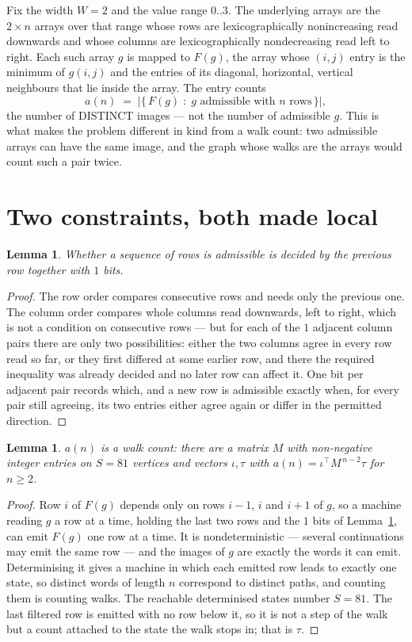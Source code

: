 \documentclass[11pt,a4paper]{article}
\theoremstyle{plain}
\newtheorem{lemma}[theorem]{Lemma}
\theoremstyle{definition}
\begin{document}
Fix the width $W=2$ and the value range $0..3$. The underlying arrays are the
$2\times n$ arrays over that range whose rows are lexicographically nonincreasing read downwards
and whose columns are lexicographically nondecreasing read left to right. Each such array $g$
is mapped to $F(g)$, the array whose $(i,j)$ entry is the minimum of $g(i,j)$ and the entries
of its diagonal, horizontal, vertical neighbours that lie inside the array. The entry counts
\[
a(n)\;=\;\bigl|\{\,F(g)\;:\;g\text{ admissible with }n\text{ rows}\,\}\bigr|,
\]
the number of DISTINCT images --- not the number of admissible $g$. This is what makes the
problem different in kind from a walk count: two admissible arrays can have the same image, and
the graph whose walks are the arrays would count such a pair twice.

\section{Two constraints, both made local}

\begin{lemma}\label{lem:local}
Whether a sequence of rows is admissible is decided by the previous row together with
$1$ bits.
\end{lemma}

\begin{proof}
The row order compares consecutive rows and needs only the previous one. The column order
compares whole columns read downwards, left to right, which is not a condition on consecutive
rows --- but for each of the $1$ adjacent column pairs there are only two possibilities:
either the two columns agree in every row read so far, or they first differed at some earlier
row, and there the required inequality was already decided and no later row can affect it. One
bit per adjacent pair records which, and a new row is admissible exactly when, for every pair
still agreeing, its two entries either agree again or differ in the permitted direction.
\end{proof}

\begin{lemma}\label{lem:det}
$a(n)$ is a walk count: there are a matrix $M$ with non-negative integer entries on $S=81$
vertices and vectors $\iota,\tau$ with $a(n)=\iota^{\!\top}M^{\,n-2}\tau$ for $n\ge2$.
\end{lemma}

\begin{proof}
Row $i$ of $F(g)$ depends only on rows $i-1$, $i$ and $i+1$ of $g$, so a machine reading $g$ a
row at a time, holding the last two rows and the $1$ bits of Lemma~\ref{lem:local}, can
emit $F(g)$ one row at a time. It is nondeterministic --- several continuations may emit the
same row --- and the images of $g$ are exactly the words it can emit. Determinising it gives a
machine in which each emitted row leads to exactly one state, so distinct words of length $n$
correspond to distinct paths, and counting them is counting walks. The reachable determinised
states number $S=81$. The last filtered row is emitted with no row below it, so it is not a
step of the walk but a count attached to the state the walk stops in; that is $\tau$.
\end{proof}
\end{document}
